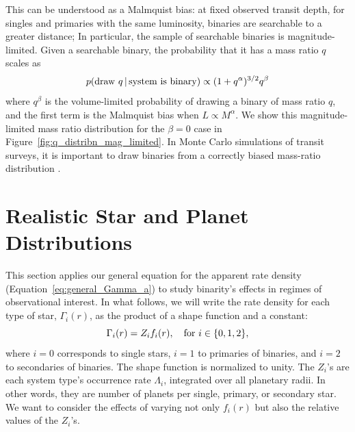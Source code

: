 \documentclass[12pt,modern]{aastex61}
\begin{document}
This can be understood as a Malmquist bias: at fixed observed transit 
depth, for singles and primaries with the same luminosity, binaries are 
searchable to a greater distance;
In particular, the sample of searchable binaries is magnitude-limited.
Given a searchable binary, the probability that it has a mass ratio $q$ 
scales as
\begin{equation}
p({\rm draw\ }q\,|\,{\rm system\ is\ binary}) \propto 
(1+q^\alpha)^{3/2} q^\beta 
\label{eq:Malmquist_bias}
\end{equation}
where $q^\beta$ is the volume-limited probability of drawing a binary of mass 
ratio $q$, and the first term is the Malmquist bias when $L\propto M^\alpha$.
We show this magnitude-limited mass ratio distribution for the $\beta=0$ case 
in Figure~\ref{fig:q_distribn_mag_limited}.
In Monte Carlo simulations of transit surveys, it is 
important to draw binaries from a correctly biased mass-ratio distribution 
\citep[\textit{e.g.},][]{bakos_hatsouth:_2013,sullivan_transiting_2015,
    gunther_new_2017}.



%

\section{Realistic Star and Planet Distributions}
\label{sec:more_complicated}
This section applies our general equation for the apparent rate 
density (Equation~\ref{eq:general_Gamma_a}) to study binarity's effects in 
regimes of observational interest.
In what follows, we will write the rate density for each type of star, 
$\Gamma_i(r)$, as the product of a shape function and a constant:
\begin{equation}
\Gamma_i(r) = Z_i f_i(r), \quad {\rm for\ }i\in\{0,1,2\},
\end{equation}
where $i=0$ corresponds to single stars, $i=1$ to primaries of 
binaries, and $i=2$ to secondaries of binaries.
The shape function is normalized to unity.
The $Z_i$'s are each system type's occurrence rate $\Lambda_i$, integrated 
over all planetary radii. In other words, they are number of planets per 
single, primary, or secondary star.
We want to consider the effects of varying not only $f_i(r)$ but also the
relative values of the $Z_i$'s.

\end{document}
